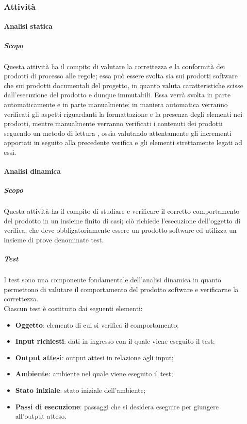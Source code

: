 \subsubsection{Attività}
\paragraph{Analisi statica}
\label{par:verifica:analisi_statica}

\subparagraph{Scopo}
Questa attività ha il compito di valutare la correttezza e la conformità dei prodotti di processo alle regole; essa può essere svolta sia
sui prodotti software che sui prodotti documentali del progetto, in quanto valuta caratteristiche scisse dall'esecuzione del prodotto e
dunque immutabili. Essa verrà svolta in parte automaticamente e in parte manualmente; in maniera automatica verranno verificati gli
aspetti riguardanti la formattazione e la presenza degli elementi nei prodotti, mentre manualmente verranno verificati i contenuti dei
prodotti seguendo un metodo di lettura , ossia valutando attentamente gli incrementi apportati in seguito alla
precedente verifica e gli elementi strettamente legati ad essi.

\paragraph{Analisi dinamica}
\label{ssub:verifica:analisi_dinamica}

\subparagraph{Scopo}

Questa attività ha il compito di studiare e verificare il corretto comportamento del prodotto in un insieme finito di casi; ciò richiede
l'esecuzione dell'oggetto di verifica, che deve obbligatoriamente essere un prodotto software ed utilizza un insieme di prove denominate
test.

\subparagraph{Test}
\label{par:verifica:test}

I test sono una componente fondamentale dell'analisi dinamica in quanto permettono di valutare il comportamento del prodotto software e
verificarne la correttezza.\\
Ciascun test è costituito dai seguenti elementi:
\begin{itemize}
    \item \textbf{Oggetto}: elemento di cui si verifica il comportamento;
    \item \textbf{Input richiesti}: dati in ingresso con il quale viene eseguito il test;
    \item \textbf{Output attesi}: output attesi in relazione agli input;
    \item \textbf{Ambiente}: ambiente nel quale viene eseguito il test;
    \item \textbf{Stato iniziale}: stato iniziale dell'ambiente;
    \item \textbf{Passi di esecuzione}: passaggi che si desidera eseguire per giungere all'output atteso.
\end{itemize}

